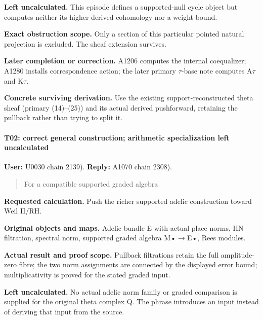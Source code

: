 \textbf{Left uncalculated.} This episode defines a supported-null cycle
object but computes neither its higher derived cohomology nor a weight
bound.

\textbf{Exact obstruction scope.} Only a section of this particular
pointed natural projection is excluded. The sheaf extension survives.

\textbf{Later completion or correction.} A1206 computes the internal
coequalizer; A1280 installs correspondence action; the later primary
\allowbreak{}\ensuremath{τ}\allowbreak{}-base note computes
A\allowbreak{}\ensuremath{τ}\allowbreak{} and
K\allowbreak{}\ensuremath{τ}\allowbreak{}.

\textbf{Concrete surviving derivation.} Use the existing
support-reconstructed theta sheaf (primary (14)--(25)) and its actual
derived pushforward, retaining the pullback rather than trying to split
it.

\paragraph{T02: correct general construction; arithmetic specialization
left
uncalculated}\label{t02-correct-general-construction-arithmetic-specialization-left-uncalculated}

\textbf{User:} U0030
\protect{} chain 2139).
\textbf{Reply:} A1070
\protect{} chain 2308).

\begin{quote}
For a compatible supported graded algebra
\end{quote}

\textbf{Requested calculation.} Push the richer supported adelic
construction toward Weil II/RH.

\textbf{Original objects and maps.} Adelic bundle E with actual place
norms, HN filtration, spectral norm, supported graded algebra
M•\allowbreak{}\ensuremath{→}\allowbreak{}E•, Rees modules.

\textbf{Actual result and proof scope.} Pullback filtrations retain the
full amplitude-zero fibre; the two norm assignments are connected by the
displayed error bound; multiplicativity is proved for the stated graded
input.

\textbf{Left uncalculated.} No actual adelic norm family or graded
comparison is supplied for the original theta complex Q. The phrase
introduces an input instead of deriving that input from the source.

